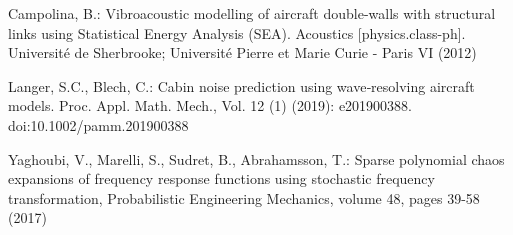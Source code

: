 \documentclass[%
  a4paper,oneside,%
  11pt,%
  smallchapters,
  green,%
  rgb, <cmyk>
  ,]{tubsbook}
\begin{document}
\lipsum[4-7] %


\begin{thebibliography}{4}
%
Campolina, B.: Vibroacoustic modelling of aircraft double-walls with structural links using Statistical
Energy Analysis (SEA). Acoustics [physics.class-ph]. Université de Sherbrooke; Université Pierre
et Marie Curie - Paris VI (2012)

Langer, S.C., Blech, C.: Cabin noise prediction using wave‐resolving aircraft models. Proc. Appl. Math. Mech., Vol. 12 (1) (2019): e201900388. doi:10.1002/pamm.201900388

 Yaghoubi, V., Marelli, S., Sudret, B., Abrahamsson, T.: Sparse polynomial chaos expansions of frequency response functions using stochastic frequency transformation, Probabilistic Engineering Mechanics, volume 48, pages 39-58 (2017)
\end{thebibliography}
\end{document}
